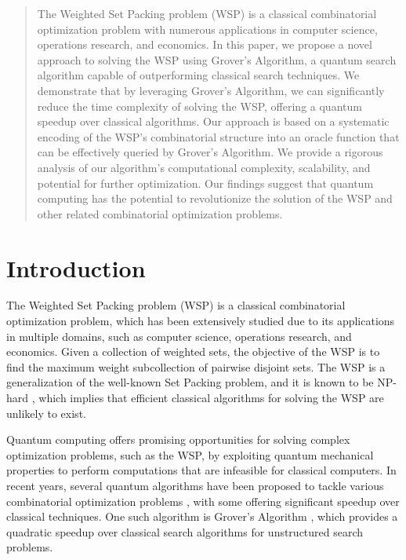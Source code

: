 \begin{abstract}
The Weighted Set Packing problem (WSP) is a classical combinatorial optimization problem with numerous applications in computer science, operations research, and economics. In this paper, we propose a novel approach to solving the WSP using Grover's Algorithm, a quantum search algorithm capable of outperforming classical search techniques. We demonstrate that by leveraging Grover's Algorithm, we can significantly reduce the time complexity of solving the WSP, offering a quantum speedup over classical algorithms. Our approach is based on a systematic encoding of the WSP's combinatorial structure into an oracle function that can be effectively queried by Grover's Algorithm. We provide a rigorous analysis of our algorithm's computational complexity, scalability, and potential for further optimization. Our findings suggest that quantum computing has the potential to revolutionize the solution of the WSP and other related combinatorial optimization problems.

\end{abstract}

\section{Introduction}

The Weighted Set Packing problem (WSP) is a classical combinatorial optimization problem, which has been extensively studied due to its applications in multiple domains, such as computer science, operations research, and economics. Given a collection of weighted sets, the objective of the WSP is to find the maximum weight subcollection of pairwise disjoint sets. The WSP is a generalization of the well-known Set Packing problem, and it is known to be NP-hard \cite{garey1979computers}, which implies that efficient classical algorithms for solving the WSP are unlikely to exist.

Quantum computing offers promising opportunities for solving complex optimization problems, such as the WSP, by exploiting quantum mechanical properties to perform computations that are infeasible for classical computers. In recent years, several quantum algorithms have been proposed to tackle various combinatorial optimization problems \cite{farhi2014quantum, kitaev2002classical}, with some offering significant speedup over classical techniques. One such algorithm is Grover's Algorithm \cite{grover1996fast}, which provides a quadratic speedup over classical search algorithms for unstructured search problems.

